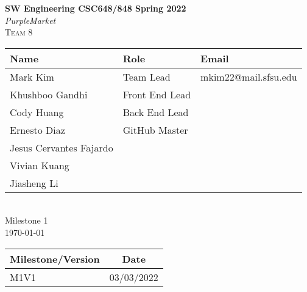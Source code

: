 \begin{titlepage}
\begin{center}
	\vspace*{1cm}
	\LARGE
	\textbf{SW Engineering CSC648/848 Spring 2022}\\
	\textit{PurpleMarket}\\
	\textsc{Team 8}\\
	\vspace{5mm}
	\normalsize
	\begin{tabular}{ | l | l | l | }
	\hline
	Name & Role & Email\\\hline
	Mark Kim & Team Lead & mkim22@mail.sfsu.edu\\
	Khushboo Gandhi & Front End Lead &\\
	Cody Huang & Back End Lead &\\
	Ernesto Diaz & GitHub Master &\\
	Jesus Cervantes Fajardo & &\\
	Vivian Kuang & &\\
	Jiasheng Li & &\\\hline
	\end{tabular}
	\large\\
	\vspace{5mm}
	Milestone 1\\
	\today\\
	\vspace{1cm}
	\begin{tabular}{ | l | c | }
		\hline
		\textbf{Milestone/Version} & \textbf{Date}\\
		\hline
		M1V1 & 03/03/2022\\
		\hline
	\end{tabular}

\end{center}
\end{titlepage}